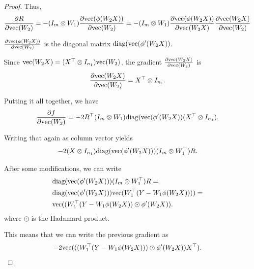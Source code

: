 \documentclass[a4paper,11pt]{article}
\newcommand{\1}{\mathbbm{1}}
\theoremstyle{plain}
\begin{document}
\begin{proof}
Thus,
\begin{align*}
    \frac{\partial R}{\partial \textnormal{vec}(W_2)} = -(I_m \otimes W_1) \frac{\partial \textnormal{vec}(\phi(W_2 X))}{\partial \textnormal{vec}(W_2)} = -(I_m \otimes W_1) \frac{\partial \textnormal{vec}(\phi(W_2 X))}{\partial \textnormal{vec}(W_2 X)} \frac{\partial \textnormal{vec}(W_2 X)}{\partial \textnormal{vec}(W_2)}
\end{align*}

$\frac{\partial \textnormal{vec}(\phi(W_2 X))}{\partial \textnormal{vec}(W_2)}$ is the diagonal matrix $\textnormal{diag}(\textnormal{vec}(\phi'(W_2 X))$.

Since $\textnormal{vec}(W_2 X) = (X^\top \otimes I_{n_1}) \textnormal{vec}(W_2)$, the gradient $\frac{\partial \textnormal{vec}(W_2 X)}{\partial \textnormal{vec}(W_2)}$ is 
\begin{equation*}
    \frac{\partial \textnormal{vec}(W_2 X)}{\partial \textnormal{vec}(W_2)} = X^\top \otimes I_{n_1}.
\end{equation*}

Putting it all together, we have
\begin{equation}
\label{eq:second_grad_2layer}
   \frac{\partial f}{\partial \textnormal{vec}(W_2)} = -2 R^\top (I_m \otimes W_1) \textnormal{diag}(\textnormal{vec}(\phi'(W_2 X)) (X^\top \otimes I_{n_1}).
\end{equation}

Writing that again as column vector yields
\begin{equation*}
    -2 (X \otimes I_{n_1}) \textnormal{diag}(\textnormal{vec}(\phi'(W_2 X))) (I_m \otimes W_1^\top) R.
\end{equation*}

After some modifications, we can write
\begin{align*}
    &\textnormal{diag}(\textnormal{vec}(\phi'(W_2 X))) (I_m \otimes W_1^\top) R = \\ & \textnormal{diag}(\textnormal{vec}(\phi'(W_2 X))) \textnormal{vec}(W_1^\top (Y-W_1 \phi(W_2 X))))  = \\ & \textnormal{vec}((W_1^\top (Y-W_1 \phi(W_2 X))\odot \phi'(W_2 X)).
\end{align*}
where $\odot$ is the Hadamard product.

This means that we can write the previous gradient as
\begin{equation*}
    -2 \textnormal{vec}(((W_1^\top (Y-W_1 \phi(W_2 X))) \odot \phi'(W_2 X) ) X^\top).
\end{equation*}


\end{proof}
\end{document}
